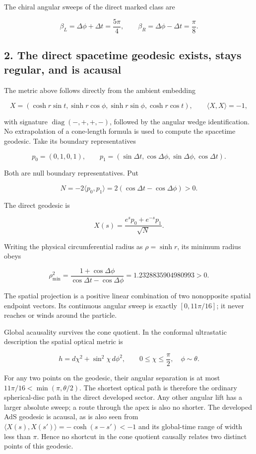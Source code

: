 \documentclass[11pt]{article}
\begin{document}
The chiral angular sweeps of the direct marked class are

\[
 \beta_L=\Delta\phi+\Delta t=\frac{5\pi}{4},\qquad
 \beta_R=\Delta\phi-\Delta t=\frac{\pi}{8}.
\]

\subsection{2. The direct spacetime geodesic exists, stays regular, and
is
acausal}\label{the-direct-spacetime-geodesic-exists-stays-regular-and-is-acausal}

The metric above follows directly from the ambient embedding

\[
 X=(\cosh r\sin t,\sinh r\cos\phi,
       \sinh r\sin\phi,\cosh r\cos t),
 \qquad \langle X,X\rangle=-1,
\]

with signature \(\operatorname{diag}(-,+,+,-)\), followed by the angular
wedge identification. No extrapolation of a cone-length formula is used
to compute the spacetime geodesic. Take its boundary representatives

\[
 p_0=(0,1,0,1),\qquad
 p_1=(\sin\Delta t,\cos\Delta\phi,\sin\Delta\phi,\cos\Delta t).
\]

Both are null boundary representatives. Put

\[
 N=-2\langle p_0,p_1\rangle
 =2(\cos\Delta t-\cos\Delta\phi)>0.
\]

The direct geodesic is

\[
 X(s)=\frac{e^s p_0+e^{-s}p_1}{\sqrt N}.
\]

Writing the physical circumferential radius as \(\rho=\sinh r\), its
minimum radius obeys

\[
 \rho_{\min}^2
 =\frac{1+\cos\Delta\phi}{\cos\Delta t-\cos\Delta\phi}
 =1.2328835904980993>0.
\]

The spatial projection is a positive linear combination of two
nonopposite spatial endpoint vectors. Its continuous angular sweep is
exactly \([0,11\pi/16]\); it never reaches or winds around the particle.

Global acausality survives the cone quotient. In the conformal
ultrastatic description the spatial optical metric is

\[
 h=d\chi^2+\sin^2\chi\,d\phi^2,
 \qquad 0\le\chi\le\frac\pi2,
 \quad \phi\sim\theta.
\]

For any two points on the geodesic, their angular separation is at most
\(11\pi/16<\min(\pi,\theta/2)\). The shortest optical path is therefore
the ordinary spherical-disc path in the direct developed sector. Any
other angular lift has a larger absolute sweep; a route through the apex
is also no shorter. The developed AdS geodesic is acausal, as is also
seen from \(\langle X(s),X(s')\rangle=-\cosh(s-s')<-1\) and its
global-time range of width less than \(\pi\). Hence no shortcut in the
cone quotient causally relates two distinct points of this geodesic.
\end{document}
